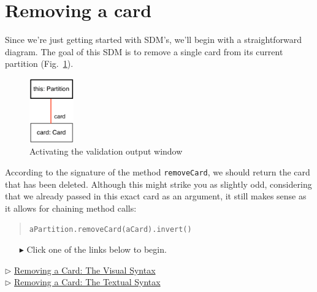 \clearpage
\genHeader
\section{Removing a card}
\hypertarget{sec:remCard}{}

Since we're just getting started with SDM's, we'll begin with a straightforward diagram. The goal of this SDM is to remove a single card from its current
partition (Fig.~\ref{fig:goal_removeCard}). 
\vspace{0.5cm}

\begin{figure}[htbp]
	\centering
    \includegraphics[width=0.17\textwidth]{removeCard.pdf}
	\caption{Activating the validation output window}
	\label{fig:goal_removeCard}
\end{figure}
\FloatBarrier

\vspace{0.5cm}

According to the signature of the method \texttt{removeCard}, we should return the card that has been deleted. Although this might strike you as slightly odd,
considering that we already passed in this exact card as an argument, it still makes sense as it allows for chaining method calls:
\begin{quote}\texttt{aPartition.removeCard(aCard).invert()}\end{quote}

\vspace{0.5cm}
\begin{itemize}
\item[$\blacktriangleright$] Click one of the links below to begin. 
\end{itemize}

\begin{center} {$\triangleright$ \hyperlink{remCard vis}{Removing a Card: The Visual Syntax}}%
\\ \vspace{0.5cm}
{$\triangleright$ \hyperlink{remCard tex}{Removing a Card: The Textual Syntax} }\end{center}  





